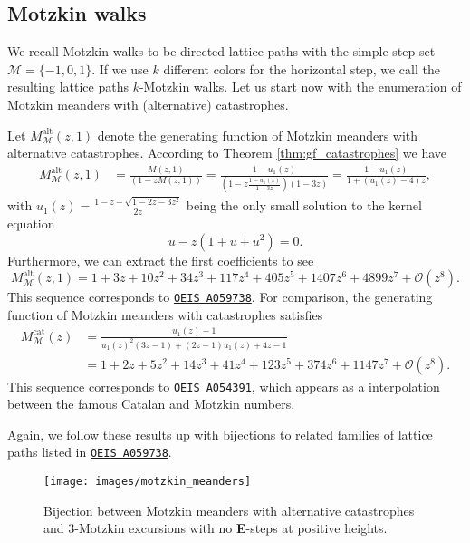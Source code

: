 \subsection{Motzkin walks}

We recall Motzkin walks to be directed lattice paths with the simple step set $\mathcal{M} = \{-1,0,1\}$. If we use $k$ different colors for the horizontal step, we call the resulting lattice paths $k$-Motzkin walks.
Let us start now with the enumeration of Motzkin meanders with (alternative) catastrophes.

\begin{example}
  Let $M_\mathcal{M}^\mathrm{alt}(z,1)$ denote the generating function of Motzkin meanders with alternative catastrophes.
  According to Theorem \ref{thm:gf_catastrophes} we have 
  \begin{align*} 
    M_\mathcal{M}^\mathrm{alt}(z,1) &= \frac{M(z,1)}{(1 - zM(z,1))} = \frac{1 - u_1(z)}{\left(1 - z\frac{1 - u_1(z)}{1 - 3z}\right)(1 - 3z)} = \frac{1 - u_{1}(z)}{1 + (u_{1}(z) - 4)z}, 
  \end{align*}
  with $u_1(z) = \frac{1 - z - \sqrt{1 - 2z - 3z^{2}}}{2z}$ being the only small solution to the kernel equation 
  $$
    u - z(1 + u + u^2) = 0.
  $$
  Furthermore, we can extract the first coefficients to see 
  $$
    M_\mathcal{M}^\mathrm{alt}(z,1) = 
    1 + 3z + 10z^{2} + 34z^{3} + 117z^{4} + 405z^{5} + 1407z^{6} + 4899z^{7} + \mathcal{O}(z^{8}).
  $$
  This sequence corresponds to \href{https://oeis.org/A059738}{\texttt{OEIS A059738}}.
  For comparison, the generating function of Motzkin meanders with catastrophes satisfies
  \begin{align*}
    M_\mathcal{M}^\mathrm{cat}(z) &= \frac{u_1(z) - 1}{u_1(z)^{2} \left(3 z - 1\right)+\left(2 z -1\right) u_1(z) + 4z -1} \\
    &= 1 + 2z + 5z^2 + 14z^3 + 41z^4 + 123z^5 + 374z^6 + 1147z^7 + \mathcal{O}(z^8).
  \end{align*}
  This sequence corresponds to \href{https://oeis.org/A054391}{\texttt{OEIS A054391}}, which appears as a interpolation between the famous Catalan and Motzkin numbers.
\end{example}

Again, we follow these results up with bijections to related families of lattice paths listed in \href{https://oeis.org/A059738}{\texttt{OEIS A059738}}. 

\begin{figure}[hbt!]
  \centering
  \texttt{[image: images/motzkin\_meanders]}
  \caption[Bijection involving Motzkin meanders with alternative catastrophes.]{Bijection between Motzkin meanders with alternative catastrophes and 3-Motzkin excursions with no \textbf{E}-steps at positive heights.}
  \label{fig:motzkin_meanders_bijection}
\end{figure}

